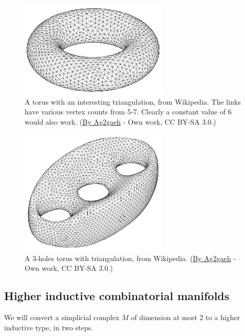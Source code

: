 \begin{figure}[htbp]
\centering
\includegraphics[width=200pt]{Torus-triang.png}
\caption{A torus with an interesting triangulation, from Wikipedia. The links have various vertex counts from 5-7. Clearly a constant value of 6 would also work. (\href{https://commons.wikimedia.org/w/index.php?curid=30856793}{By Ag2gaeh} - Own work, CC BY-SA 3.0.)}
\label{fig:torus_wiki_triangulation}
\end{figure}

\begin{figure}[htbp]
\centering
\includegraphics[width=200pt]{triangulated_genus3.pdf}
\caption{A 3-holes torus with triangulation, from Wikipedia. (\href{https://commons.wikimedia.org/wiki/File:Tri-brezel.svg}{By Ag2gaeh} - Own work, CC BY-SA 3.0.)}
\label{fig:genus3_wiki_triangulation}
\end{figure}

\subsection{Higher inductive combinatorial manifolds}

We will convert a simplicial complex \( M \) of dimension at most 2 to a higher inductive type, in two steps. 

